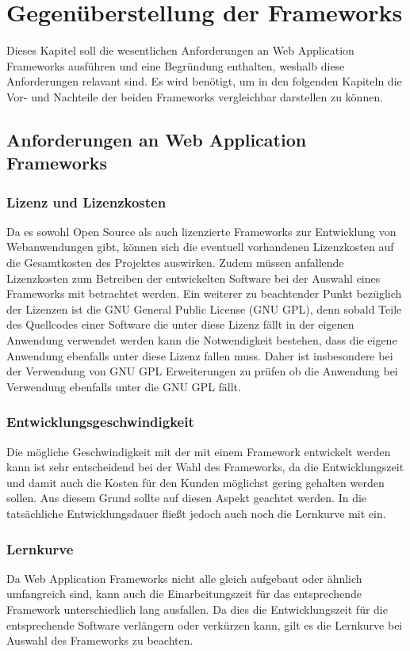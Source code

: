\section{Gegenüberstellung der Frameworks}
Dieses Kapitel soll die wesentlichen Anforderungen an Web Application Frameworks ausführen und eine Begründung enthalten, weshalb diese Anforderungen relavant sind. Es wird benötigt, um in den folgenden Kapiteln die Vor- und Nachteile der beiden Frameworks vergleichbar darstellen zu können.
\subsection{Anforderungen an Web Application Frameworks}
\subsubsection{Lizenz und Lizenzkosten}
Da es sowohl Open Source als auch lizenzierte Frameworks zur Entwicklung von Webanwendungen gibt, können sich die eventuell vorhandenen Lizenzkosten auf die Gesamtkosten des Projektes auswirken. Zudem müssen anfallende Lizenzkosten zum Betreiben der entwickelten Software bei der Auswahl eines Frameworks mit betrachtet werden.
Ein weiterer zu beachtender Punkt bezüglich der Lizenzen ist die GNU General Public License (GNU GPL), denn sobald Teile des Quellcodes einer Software die unter diese Lizenz fällt in der eigenen Anwendung verwendet werden kann die Notwendigkeit bestehen, dass die eigene Anwendung ebenfalls unter diese Lizenz fallen muss. Daher ist insbesondere bei der Verwendung von GNU GPL Erweiterungen zu prüfen ob die Anwendung bei Verwendung ebenfalls unter die GNU GPL fällt.\citep[S.214]{EFCMW2013} 
\subsubsection{Entwicklungsgeschwindigkeit}
Die mögliche Geschwindigkeit mit der mit einem Framework entwickelt werden kann ist sehr entscheidend bei der Wahl des Frameworks, da die Entwicklungszeit und damit auch die Kosten für den Kunden möglichst gering gehalten werden sollen. Aus diesem Grund sollte auf diesen Aspekt geachtet werden. In die tatsächliche Entwicklungsdauer fließt jedoch auch noch die Lernkurve mit ein.\citep[S.214]{EFCMW2013}
\subsubsection{Lernkurve}
Da Web Application Frameworks nicht alle gleich aufgebaut oder ähnlich umfangreich sind, kann auch die Einarbeitungszeit für das entsprechende Framework unterschiedlich lang ausfallen. Da dies die Entwicklungszeit für die entsprechende Software verlängern oder verkürzen kann, gilt es die Lernkurve bei Auswahl des Frameworks zu beachten.\citep[S.214]{EFCMW2013}
